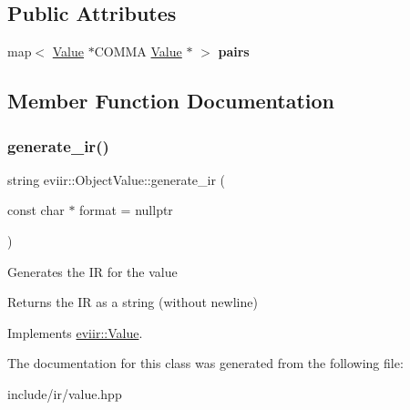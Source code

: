 \subsection*{Public Attributes}
\begin{DoxyCompactItemize}
\item 
\mbox{\label{classeviir_1_1ObjectValue_a650b6fad2e883e7e006ce8ca491a94e1}} 
map$<$ \hyperlink{classeviir_1_1Value}{Value} $\ast$C\+O\+M\+MA \hyperlink{classeviir_1_1Value}{Value} $\ast$ $>$ {\bfseries pairs}
\end{DoxyCompactItemize}


\subsection{Member Function Documentation}
\mbox{\label{classeviir_1_1ObjectValue_a72adc8371c09638a785ed3823516e817}} 
\subsubsection{\texorpdfstring{generate\+\_\+ir()}{generate\_ir()}}
{\footnotesize\ttfamily string eviir\+::\+Object\+Value\+::generate\+\_\+ir (\begin{DoxyParamCaption}\item[{const char $\ast$}]{format = {\ttfamily nullptr} }\end{DoxyParamCaption})\hspace{0.3cm}{\ttfamily [virtual]}}

Generates the IR for the value \begin{DoxyReturn}{Returns}
the IR as a string (without newline) 
\end{DoxyReturn}


Implements \hyperlink{classeviir_1_1Value_a0613bf660425df31e230681555f64dea}{eviir\+::\+Value}.



The documentation for this class was generated from the following file\+:\begin{DoxyCompactItemize}
\item 
include/ir/value.\+hpp\end{DoxyCompactItemize}
